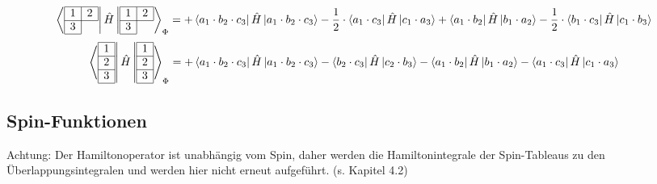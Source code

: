\documentclass[fleqn]{article}%
\newcommand{\checkpagebreak}{\needspace{.25\textheight}}%
\begin{document}
\begin{dmath*}\bra{\begin{array}{|c|c|} \hline 1 & 2\\ \cline{1-2} 3\\ \cline{1-1} \end{array} }\hat{H}\ket{\begin{array}{|c|c|} \hline 1 & 2\\ \cline{1-2} 3\\ \cline{1-1} \end{array} }_{\Phi} = + \bra{ a_{1} \cdot b_{2} \cdot c_{3} } \hat{H} \ket{ a_{1} \cdot b_{2} \cdot c_{3}}- \frac{1}{2}  \cdot \bra{ a_{1} \cdot c_{3} } \hat{H} \ket{ c_{1} \cdot a_{3}}+ \bra{ a_{1} \cdot b_{2} } \hat{H} \ket{ b_{1} \cdot a_{2}}- \frac{1}{2}  \cdot \bra{ b_{1} \cdot c_{3} } \hat{H} \ket{ c_{1} \cdot b_{3}}\end{dmath*}%
\vspace{0.25cm}%
\begin{dmath*}\bra{\begin{array}{|c|} \hline 1\\ \cline{1-1} 2\\ \cline{1-1} 3\\ \cline{1-1} \end{array} }\hat{H}\ket{\begin{array}{|c|} \hline 1\\ \cline{1-1} 2\\ \cline{1-1} 3\\ \cline{1-1} \end{array} }_{\Phi} = + \bra{ a_{1} \cdot b_{2} \cdot c_{3} } \hat{H} \ket{ a_{1} \cdot b_{2} \cdot c_{3}}- \bra{ b_{2} \cdot c_{3} } \hat{H} \ket{ c_{2} \cdot b_{3}}- \bra{ a_{1} \cdot b_{2} } \hat{H} \ket{ b_{1} \cdot a_{2}}- \bra{ a_{1} \cdot c_{3} } \hat{H} \ket{ c_{1} \cdot a_{3}}\end{dmath*}%
\vspace{0.25cm}%
\checkpagebreak%
\subsection{Spin{-}Funktionen}%
\label{subsec:Spin{-}Funktionen}%
Achtung: Der Hamiltonoperator ist unabhängig vom Spin, daher werden die Hamiltonintegrale der Spin-Tableaus zu den Überlappungsintegralen und werden hier nicht erneut aufgeführt. (s. Kapitel 4.2) 

%
\newpage%
\tableofcontents%
\thispagestyle{fancy}%
\end{document}
